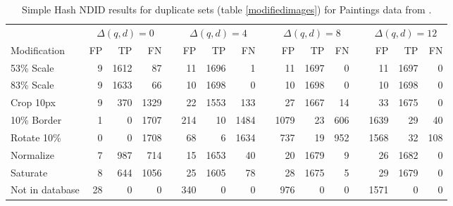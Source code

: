 \documentclass[english,12pt,a4paper,pdftex,elec,utf8, table]{aaltothesis}
\begin{document}
\begin{table}[htb]\footnotesize
\caption{ Simple Hash NDID results for duplicate sets (table \ref{modifiedimages}) for Paintings data from \cite{Vedaldi2012}. }
\label{simpleresults}
\begin{center}
  \setlength\tabcolsep{3pt} %
  \begin{tabular}{@{}lrrrrrrrrrrrrrrr@{}}
    \toprule
    & \multicolumn{3}{c}{$\Delta(q,d) = 0$} &\phantom{abc} &\multicolumn{3}{c}{$\Delta(q,d) = 4$} &\phantom{abc} & \multicolumn{3}{c}{$\Delta(q,d)=8$} &\phantom{abc} & \multicolumn{3}{c}{$\Delta(q,d)=12$}\\
\cmidrule{2-4} \cmidrule{6-8} \cmidrule{10-12} \cmidrule{14-16}
    Modification & FP & TP & FN &\phantom{abc} & FP & TP & FN &\phantom{abc} & FP & TP & FN &\phantom{abc} & FP & TP & FN\\ \midrule
    53\% Scale   & 9 & 1612 & 87 &\phantom{abc} & 11 & 1696 & 1 &\phantom{abc} & 11 & 1697 & 0 &\phantom{abc} & 11 & 1697 & 0\\
    83\% Scale   & 9 & 1633 & 66 &\phantom{abc} & 10 & 1698 & 0 &\phantom{abc} & 10 & 1698 & 0 &\phantom{abc} & 10 & 1698 & 0\\
    Crop 10px    & 9 & 370 & 1329 &\phantom{abc} & 22 & 1553 & 133 &\phantom{abc} & 27 & 1667 & 14 &\phantom{abc} & 33 & 1675 & 0\\
    10\% Border  & 1 & 0 & 1707 & \phantom{abc} & 214 & 10 & 1484 &\phantom{abc} & 1079 & 23 & 606 &\phantom{abc} & 1639 & 29 & 40\\
    Rotate 10\%  & 0 & 0 & 1708 &\phantom{abc} & 68 & 6 & 1634 &\phantom{abc} & 737 & 19 & 952 &\phantom{abc} & 1568 & 32 & 108\\
    Normalize    & 7 & 987 & 714 &\phantom{abc} & 15 & 1653 & 40 &\phantom{abc} & 20 & 1679 & 9 &\phantom{abc} & 26 & 1682 & 0\\
    Saturate     & 8 & 644 & 1056 &\phantom{abc} & 25 & 1605 & 78 &\phantom{abc} & 28 & 1675 & 5 &\phantom{abc} & 29 & 1679 & 0\\
    Not in database     & 28 & 0 & 0 &\phantom{abc} & 340 & 0 & 0 &\phantom{abc} & 976 & 0 & 0 &\phantom{abc} & 1571& 0& 0\\

    \bottomrule
\end{tabular}
\end{center}
\end{table}
\end{document}
